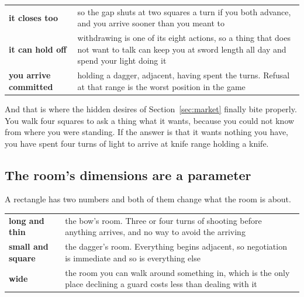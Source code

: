 \documentclass[11pt,a4paper]{article}
\begin{document}
\begin{center}
\begin{tabular}{@{}l@{\hspace{4mm}}>{\raggedright\arraybackslash}p{}@{}}
\toprule
\textbf{it closes too} & so the gap shuts at two squares a turn if you both advance, and you arrive
sooner than you meant to \\[1mm]
\textbf{it can hold off} & withdrawing is one of its eight actions, so a thing that does not want to
talk can keep you at sword length all day and spend your light doing it \\[1mm]
\textbf{you arrive committed} & holding a dagger, adjacent, having spent the turns. Refusal at that
range is the worst position in the game \\
\bottomrule
\end{tabular}
\end{center}

\begin{sectionbox}
And that is where the hidden desires of Section~\ref{sec:market} finally bite properly. You walk
four squares to ask a thing what it wants, because you could not know from where you were standing.
If the answer is that it wants nothing you have, you have spent four turns of light to arrive at
knife range holding a knife.
\end{sectionbox}

\subsection{The room's dimensions are a parameter}

A rectangle has two numbers and both of them change what the room is about.

\begin{center}
\begin{tabular}{@{}l@{\hspace{4mm}}>{\raggedright\arraybackslash}p{}@{}}
\toprule
\textbf{long and thin}  & the bow's room. Three or four turns of shooting before anything arrives,
and no way to avoid the arriving \\[1mm]
\textbf{small and square} & the dagger's room. Everything begins adjacent, so negotiation is
immediate and so is everything else \\[1mm]
\textbf{wide}           & the room you can walk around something in, which is the only place
declining a guard costs less than dealing with it \\
\bottomrule
\end{tabular}
\end{center}
\end{document}
